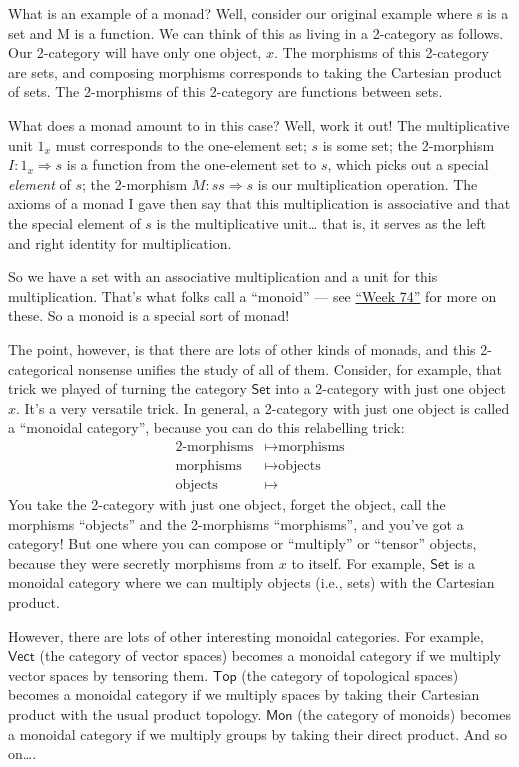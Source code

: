 \documentclass{article}
\begin{document}
What is an example of a monad? Well, consider our original example where
s is a set and M is a function. We can think of this as living in a
2-category as follows. Our 2-category will have only one object, \(x\).
The morphisms of this 2-category are sets, and composing morphisms
corresponds to taking the Cartesian product of sets. The 2-morphisms of
this 2-category are functions between sets.

What does a monad amount to in this case? Well, work it out! The
multiplicative unit \(1_x\) must corresponds to the one-element set;
\(s\) is some set; the 2-morphism \(I\colon 1_x\Rightarrow s\) is a
function from the one-element set to \(s\), which picks out a special
\emph{element} of \(s\); the 2-morphism \(M\colon ss\Rightarrow s\) is
our multiplication operation. The axioms of a monad I gave then say that
this multiplication is associative and that the special element of \(s\)
is the multiplicative unit\ldots{} that is, it serves as the left and
right identity for multiplication.

So we have a set with an associative multiplication and a unit for this
multiplication. That's what folks call a ``monoid'' --- see
\protect\hyperlink{week74}{``Week 74''} for more on these. So a monoid
is a special sort of monad!

The point, however, is that there are lots of other kinds of monads, and
this 2-categorical nonsense unifies the study of all of them. Consider,
for example, that trick we played of turning the category
\(\mathsf{Set}\) into a 2-category with just one object \(x\). It's a
very versatile trick. In general, a 2-category with just one object is
called a ``monoidal category'', because you can do this relabelling
trick: \[
  \begin{aligned}
    \text{2-morphisms} &\mapsto \text{morphisms}
  \\\text{morphisms} &\mapsto \text{objects}
  \\\text{objects} &\mapsto 
  \end{aligned}
\] You take the 2-category with just one object, forget the object, call
the morphisms ``objects'' and the 2-morphisms ``morphisms'', and you've
got a category! But one where you can compose or ``multiply'' or
``tensor'' objects, because they were secretly morphisms from \(x\) to
itself. For example, \(\mathsf{Set}\) is a monoidal category where we
can multiply objects (i.e., sets) with the Cartesian product.

However, there are lots of other interesting monoidal categories. For
example, \(\mathsf{Vect}\) (the category of vector spaces) becomes a
monoidal category if we multiply vector spaces by tensoring them.
\(\mathsf{Top}\) (the category of topological spaces) becomes a monoidal
category if we multiply spaces by taking their Cartesian product with
the usual product topology. \(\mathsf{Mon}\) (the category of monoids)
becomes a monoidal category if we multiply groups by taking their direct
product. And so on\ldots.
\end{document}
